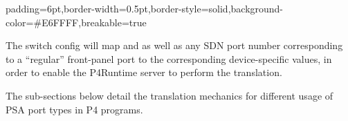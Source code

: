 \documentclass[11pt]{article}
\begin{document}
{%
\begin{mdbmargintb}{6pt}{6pt}%
\begin{mdblock}{padding=6pt,border-width=0.5pt,border-style=solid,background-color=\#E6FFFF,breakable=true}%
\begin{mdpre}%
\end{mdpre}%
\end{mdblock}%
\end{mdbmargintb}%

\noindent{}The switch config will map  and  \textemdash{} as well
as any SDN port number corresponding to a \textquotedblleft{}regular\textquotedblright{} front-panel port \textemdash{} to the
corresponding device-specific values, in order to enable the P4Runtime server to
perform the translation.%

The sub-sections below detail the translation mechanics for different usage of
PSA port types in P4 programs.%

}
\end{document}
